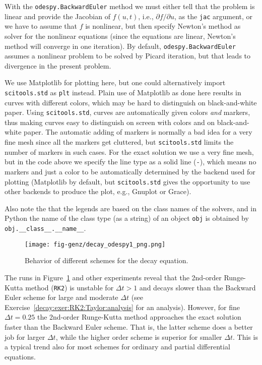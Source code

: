 \documentclass[graybox,sectrefs,envcountresetchap,open=right,final]{svmonodo}
\newenvironment{notice_mdfboxadmon}[1][]{
\begin{notice_mdfboxmdframed}[frametitle=#1]
}
{
\end{notice_mdfboxmdframed}
}
\begin{document}
With the \texttt{odespy.BackwardEuler} method we must either tell that
the problem is linear and provide the Jacobian of $f(u,t)$, i.e.,
$\partial f/\partial u$, as the \texttt{jac} argument, or we have to assume
that $f$ is nonlinear, but then specify Newton's method as solver
for the nonlinear equations (since the equations are linear, Newton's
method will converge in one iteration). By default,
\texttt{odespy.BackwardEuler} assumes a nonlinear problem to be solved by
Picard iteration, but that leads to divergence in the present problem.


\begin{notice_mdfboxadmon}
We use Matplotlib for
plotting here, but one could alternatively import \texttt{scitools.std} as \texttt{plt} instead. Plain use of Matplotlib as done here results in
curves with different colors, which may be hard to distinguish on
black-and-white paper. Using \texttt{scitools.std}, curves are
automatically given colors \emph{and} markers, thus making curves easy
to distinguish on screen with colors and on black-and-white paper.
The automatic adding of markers is normally a bad idea for a
very fine mesh since all the markers get cluttered, but \texttt{scitools.std} limits
the number of markers in such cases.
For the exact solution we use a very fine mesh, but in the code
above we specify the line type as a solid line (\texttt{-}), which means
no markers and just a color to be automatically determined by
the backend used for plotting (Matplotlib by default, but
\texttt{scitools.std} gives the opportunity to use other backends
to produce the plot, e.g., Gnuplot or Grace).

Also note the that the legends
are based on the class names of the solvers, and in Python the name of
the class type (as a string) of an object \texttt{obj} is obtained by
\Verb!obj.__class__.__name__!.
\end{notice_mdfboxadmon} %



\begin{figure}[!ht]  %
  \centerline{\texttt{[image: fig-genz/decay\_odespy1\_png.png]}}
  \caption{
  Behavior of different schemes for the decay equation. \label{decay:odespy:fig1}
  }
\end{figure}

The runs in Figure~\ref{decay:odespy:fig1}
and other experiments reveal that the 2nd-order Runge-Kutta
method (\texttt{RK2}) is unstable for $\Delta t>1$ and decays slower than the
Backward Euler scheme for large and moderate $\Delta t$ (see Exercise~\ref{decay:exer:RK2:Taylor:analysis} for an analysis).  However, for
fine $\Delta t = 0.25$ the 2nd-order Runge-Kutta method approaches
the exact solution faster than the Backward Euler scheme.  That is,
the latter scheme does a better job for larger $\Delta t$, while the
higher order scheme is superior for smaller $\Delta t$. This is a
typical trend also for most schemes for ordinary and partial
differential equations.
\end{document}
